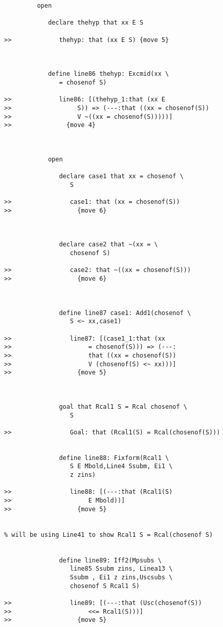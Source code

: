 \documentclass[12pt]{article}
\begin{document}
\begin{verbatim}
         open

            declare thehyp that xx E S

>>             thehyp: that (xx E S) {move 5}



            define line86 thehyp: Excmid(xx \
               = chosenof S)

>>             line86: [(thehyp_1:that (xx E
>>                  S)) => (---:that ((xx = chosenof(S))
>>                  V ~((xx = chosenof(S)))))]
>>               {move 4}



            open

               declare case1 that xx = chosenof \
                  S

>>                case1: that (xx = chosenof(S))
>>                  {move 6}



               declare case2 that ~(xx = \
                  chosenof S)

>>                case2: that ~((xx = chosenof(S)))
>>                  {move 6}



               define line87 case1: Add1(chosenof \
                  S <~ xx,case1)

>>                line87: [(case1_1:that (xx
>>                     = chosenof(S))) => (---:
>>                     that ((xx = chosenof(S))
>>                     V (chosenof(S) <~ xx)))]
>>                  {move 5}



               goal that Rcal1 S = Rcal chosenof \
                  S

>>                Goal: that (Rcal1(S) = Rcal(chosenof(S)))


               define line88: Fixform(Rcal1 \
                  S E Mbold,Line4 Ssubm, Ei1 \
                  z zins)

>>                line88: [(---:that (Rcal1(S)
>>                     E Mbold))]
>>                  {move 5}


% will be using Line41 to show Rcal1 S = Rcal(chosenof S)


               define line89: Iff2(Mpsubs \
                  line85 Ssubm zins, Linea13 \
                  Ssubm , Ei1 z zins,Uscsubs \
                  chosenof S Rcal1 S)

>>                line89: [(---:that (Usc(chosenof(S))
>>                     <<= Rcal1(S)))]
>>                  {move 5}




\end{verbatim}
\end{document}
